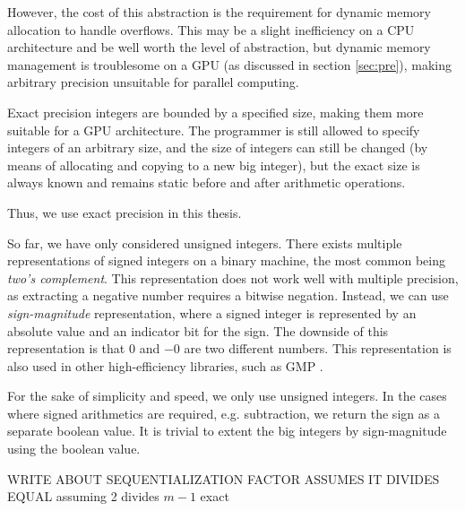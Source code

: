 However, the cost of this abstraction is the requirement for dynamic memory
allocation to handle overflows. This may be a slight inefficiency on a CPU
architecture and be well worth the level of abstraction, but dynamic memory
management is troublesome on a GPU (as discussed in section
\ref{sec:pre}), making arbitrary precision unsuitable for parallel computing.

Exact precision integers are bounded by a specified size, making them more
suitable for a GPU architecture. The programmer is still allowed to specify
integers of an arbitrary size, and the size of integers can still be changed (by
means of allocating and copying to a new big integer), but the exact size is
always known and remains static before and after arithmetic operations.

Thus, we use exact precision in this thesis.

So far, we have only considered unsigned integers. There exists multiple
representations of signed integers on a binary machine, the most common being
\textit{two's complement}. This representation does not work well with multiple
precision, as extracting a negative number requires a bitwise negation. Instead,
we can use \textit{sign-magnitude} representation, where a signed integer is
represented by an absolute value and an indicator bit for the sign. The downside
of this representation is that $0$ and $-0$ are two different numbers. This
representation is also used in other high-efficiency libraries, such as GMP
\cite{GMP}.

For the sake of simplicity and speed, we only use unsigned integers. In the
cases where signed arithmetics are required, e.g. subtraction, we return the
sign as a separate boolean value. It is trivial to extent the big integers by
sign-magnitude using the boolean value.

{\red WRITE ABOUT SEQUENTIALIZATION FACTOR ASSUMES IT DIVIDES EQUAL
assuming 2
divides $m-1$ exact
}

